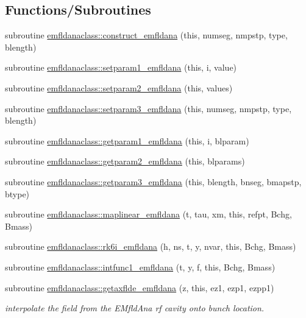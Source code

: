\subsection*{Functions/\+Subroutines}
\begin{DoxyCompactItemize}
\item 
subroutine \mbox{\hyperlink{namespaceemfldanaclass_a56809546255dc4d8ef545de43f8ced80}{emfldanaclass\+::construct\+\_\+emfldana}} (this, numseg, nmpstp, type, blength)
\item 
subroutine \mbox{\hyperlink{namespaceemfldanaclass_acef322ec41908ed27c9dc0f7fe9f4c1c}{emfldanaclass\+::setparam1\+\_\+emfldana}} (this, i, value)
\item 
subroutine \mbox{\hyperlink{namespaceemfldanaclass_aac0a3936b2e95e4a86fee5277907646e}{emfldanaclass\+::setparam2\+\_\+emfldana}} (this, values)
\item 
subroutine \mbox{\hyperlink{namespaceemfldanaclass_aad90f0dd7002f12e7a5ba004dfb37635}{emfldanaclass\+::setparam3\+\_\+emfldana}} (this, numseg, nmpstp, type, blength)
\item 
subroutine \mbox{\hyperlink{namespaceemfldanaclass_ae345ffd1b3393ca091f8cdf3409e3088}{emfldanaclass\+::getparam1\+\_\+emfldana}} (this, i, blparam)
\item 
subroutine \mbox{\hyperlink{namespaceemfldanaclass_ae0015cdb617a1920e47dbc2274fb77b2}{emfldanaclass\+::getparam2\+\_\+emfldana}} (this, blparams)
\item 
subroutine \mbox{\hyperlink{namespaceemfldanaclass_a67575d528d7993efafb802f4c346d6c0}{emfldanaclass\+::getparam3\+\_\+emfldana}} (this, blength, bnseg, bmapstp, btype)
\item 
subroutine \mbox{\hyperlink{namespaceemfldanaclass_aabcc1ab7e5ac19f07fba4e38cfe24b04}{emfldanaclass\+::maplinear\+\_\+emfldana}} (t, tau, xm, this, refpt, Bchg, Bmass)
\item 
subroutine \mbox{\hyperlink{namespaceemfldanaclass_aed1f8dea5d7871c10eb2835b204dd581}{emfldanaclass\+::rk6i\+\_\+emfldana}} (h, ns, t, y, nvar, this, Bchg, Bmass)
\item 
subroutine \mbox{\hyperlink{namespaceemfldanaclass_aeab0c2abbaa5f527784ce7006d3b4d58}{emfldanaclass\+::intfunc1\+\_\+emfldana}} (t, y, f, this, Bchg, Bmass)
\item 
subroutine \mbox{\hyperlink{namespaceemfldanaclass_a4f3936b925964dccc4f9911bcf93c2d7}{emfldanaclass\+::getaxflde\+\_\+emfldana}} (z, this, ez1, ezp1, ezpp1)
\begin{DoxyCompactList}\small\item\em interpolate the field from the E\+Mfld\+Ana rf cavity onto bunch location. \end{DoxyCompactList}\item 

\end{DoxyCompactItemize}
